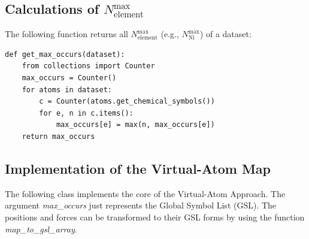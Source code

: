 \documentclass[preprint]{revtex4-2}
\begin{document}
% 
%
\subsection{
    Calculations of 
    \texorpdfstring{$N_{\mathrm{element}}^{\mathrm{max}}$}{Nelmax} 
}

The following function returns all $N_{\mathrm{element}}^{\mathrm{max}}$ (e.g., 
$N_{\mathrm{Ni}}^{\mathrm{max}}$) of a dataset:
\begin{verbatim}
def get_max_occurs(dataset):
    from collections import Counter
    max_occurs = Counter()
    for atoms in dataset:
        c = Counter(atoms.get_chemical_symbols())
        for e, n in c.items():
            max_occurs[e] = max(n, max_occurs[e])
    return max_occurs
\end{verbatim}

% 
%
\subsection{Implementation of the Virtual-Atom Map}

The following class implements the core of the Virtual-Atom Approach. The 
argument \textit{max\_occurs} just represents the Global Symbol List (GSL). The
positions and forces can be transformed to their GSL forms by using the function
\textit{map\_to\_gsl\_array}.
\end{document}
